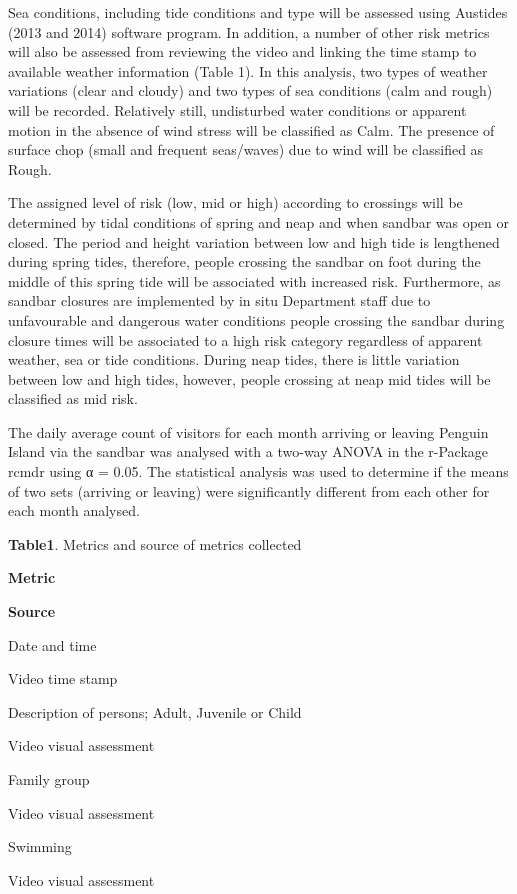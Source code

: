 \documentclass[version=last,
    paper=a4,                               %
    10pt,                                   %
    dvipsnames,
    oneside,                              %
    headings=openany,                       %
    open=any,
    BCOR=7mm,                               %
    DIV=15,     %
]{scrbook}
\begin{document}
Sea conditions, including tide conditions and type will be assessed
using Austides (2013 and 2014) software program. In addition, a number
of other risk metrics will also be assessed from reviewing the video and
linking the time stamp to available weather information (Table 1). In
this analysis, two types of weather variations (clear and cloudy) and
two types of sea conditions (calm and rough) will be recorded.
Relatively still, undisturbed water conditions or apparent motion in the
absence of wind stress will be classified as Calm. The presence of
surface chop (small and frequent seas/waves) due to wind will be
classified as Rough.

The assigned level of risk (low, mid or high) according to crossings
will be determined by tidal conditions of spring and neap and when
sandbar was open or closed. The period and height variation between low
and high tide is lengthened during spring tides, therefore, people
crossing the sandbar on foot during the middle of this spring tide will
be associated with increased risk. Furthermore, as sandbar closures are
implemented by in situ Department staff due to unfavourable and
dangerous water conditions people crossing the sandbar during closure
times will be associated to a high risk category regardless of apparent
weather, sea or tide conditions. During neap tides, there is little
variation between low and high tides, however, people crossing at neap
mid tides will be classified as mid risk.

The daily average count of visitors for each month arriving or leaving
Penguin Island via the sandbar was analysed with a two-way ANOVA in the
r-Package rcmdr using α = 0.05. The statistical analysis was used to
determine if the means of two sets (arriving or leaving) were
significantly different from each other for each month analysed.

\textbf{Table}\textbf{1}. Metrics and source of metrics collected

\textbf{Metric}

\textbf{Source}

Date and time

Video time stamp

Description of persons; Adult, Juvenile or Child

Video visual assessment

Family group

Video visual assessment

Swimming

Video visual assessment
\end{document}

